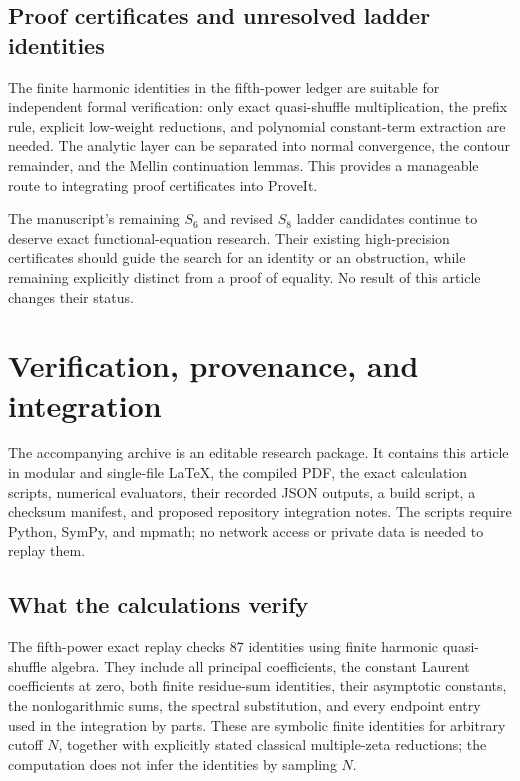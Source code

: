 \documentclass[11pt,a4paper]{article}
\numberwithin{equation}{section}
\theoremstyle{definition}
\begin{document}
\subsection{Proof certificates and unresolved ladder identities}

The finite harmonic identities in the fifth-power ledger are suitable
for independent formal verification: only exact quasi-shuffle
multiplication, the prefix rule, explicit low-weight reductions, and
polynomial constant-term extraction are needed. The analytic layer
can be separated into normal convergence, the contour remainder,
and the Mellin continuation lemmas. This provides a manageable route
to integrating proof certificates into ProveIt.

The manuscript's remaining $S_6$ and revised $S_8$ ladder candidates
continue to deserve exact functional-equation research. Their
existing high-precision certificates should guide the search for
an identity or an obstruction, while remaining explicitly distinct
from a proof of equality. No result of this article changes their
status.


\section{Verification, provenance, and integration}
\label{sec:reproducibility}

The accompanying archive is an editable research package. It contains
this article in modular and single-file \LaTeX, the compiled PDF,
the exact calculation scripts, numerical evaluators, their recorded
JSON outputs, a build script, a checksum manifest, and proposed
repository integration notes. The scripts require Python, SymPy, and
mpmath; no network access or private data is needed to replay them.

\subsection{What the calculations verify}

The fifth-power exact replay checks 87 identities using finite harmonic
quasi-shuffle algebra. They include all principal coefficients, the
constant Laurent coefficients at zero, both finite residue-sum
identities, their asymptotic constants, the nonlogarithmic sums,
the spectral substitution, and every endpoint entry used in the
integration by parts. These are symbolic finite identities for
arbitrary cutoff $N$, together with explicitly stated classical
multiple-zeta reductions; the computation does not infer the
identities by sampling $N$.
\end{document}
